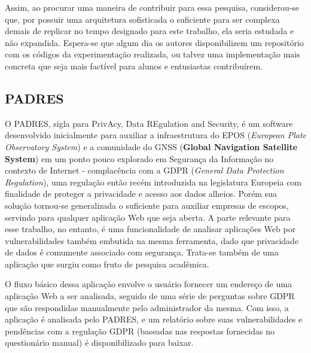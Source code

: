 Assim, ao procurar uma maneira de contribuir para essa pesquisa, considerou-se que, por possuir uma arquitetura sofisticada o suficiente para ser complexa demais de replicar no tempo designado para este trabalho, ela seria estudada e não expandida. Espera-se que algum dia os autores disponibilizem um repositório com os códigos da experimentação realizada, ou talvez uma implementação mais concreta que seja mais factível para alunos e entusiastas contribuírem.

\subsection{PADRES}

O PADRES, sigla para PrivAcy, Data REgulation and Security, é um software desenvolvido inicialmente para auxiliar a infraestrutura do EPOS (\textit{European Plate Observatory System}) e a comunidade do GNSS (\textbf{Global Navigation Satellite System}) em um ponto pouco explorado em Segurança da Informação no contexto de Internet - complacência com a GDPR (\textit{General Data Protection Regulation}), uma regulação então recém introduzida na legislatura Europeia com finalidade de proteger a privacidade e acesso aos dados alheios. Porém sua solução tornou-se generalizada o suficiente para auxiliar empresas de escopos, servindo para qualquer aplicação Web que seja aberta. A parte relevante para esse trabalho, no entanto, é uma funcionalidade de analisar aplicações Web por vulnerabilidades também embutida na mesma ferramenta, dado que privacidade de dados é comumente associado com segurança. Trata-se também de uma aplicação que surgiu como fruto de pesquisa acadêmica.

O fluxo básico dessa aplicação envolve o usuário fornecer um endereço de uma aplicação Web a ser analisada, seguido de uma série de perguntas sobre GDPR que são respondidas manualmente pelo administrador da mesma. Com isso, a aplicação é analisada pelo PADRES, e um relatório sobre suas vulnerabilidades e pendências com a regulação GDPR (baseadas nas respostas fornecidas no questionário manual) é disponibilizado para baixar. 

